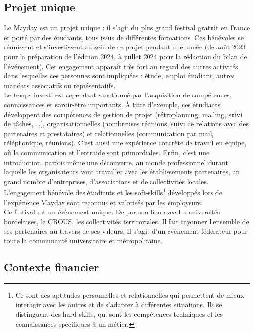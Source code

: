 \documentclass[12pt,a4paper]{report}
\begin{document}
\subsection*{Projet unique}

Le Mayday est un projet unique : il s'agit du plus grand festival gratuit en France et porté par des étudiants, tous issus de différentes formations. Ces bénévoles se réunissent et s'investissent au sein de ce projet pendant une année (de août 2023 pour la préparation de l'édition 2024, à juillet 2024 pour la rédaction du bilan de l’événement). Cet engagement apparaît très fort au regard des autres activités dans lesquelles ces personnes sont impliquées : étude, emploi étudiant, autres mandats associatifs ou représentatifs.\\

\sloppy Le temps investi est cependant sanctionné par l'acquisition de compétences, connaissances et savoir-être importants. À titre d'exemple, ces étudiants développent des compétences de gestion de projet (rétroplanning, mailing, suivi de tâches, …), organisationnelles (nombreuses réunions, suivi de relations avec des partenaires et prestataires) et relationnelles (communication par mail, téléphonique, réunions). C’est aussi une expérience concrète de travail en équipe, où la communication et l'entraide sont primordiales. Enfin, c’est une introduction, parfois même une découverte, au monde professionnel durant laquelle les organisateurs vont travailler avec les établissements partenaires, un grand nombre d'entreprises, d’associations et de collectivités locales.\\

L’engagement bénévole des étudiants et les soft-skills\footnote{Ce sont des aptitudes personnelles et relationnelles qui permettent de mieux interagir avec les autres et de s'adapter à différentes situations. Ils se distinguent des hard skills, qui sont les compétences techniques et les connaissances spécifiques à un métier.} développés lors de l’expérience Mayday sont reconnus et valorisés par les employeurs.\\

Ce festival est un évènement unique. De par son lien avec les universités bordelaises, le CROUS, les collectivités territoriales. Il fait rayonner l'ensemble de ses partenaires au travers de ses valeurs. Il s’agit d’un évènement fédérateur pour toute la communauté universitaire et métropolitaine.

\subsection*{Contexte financier}
\end{document}
